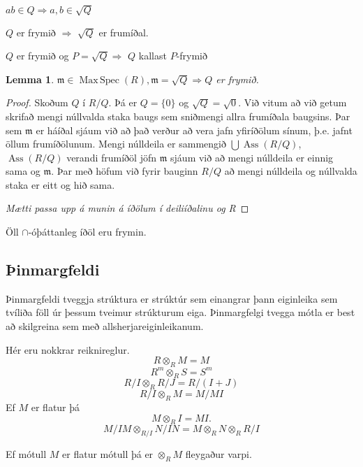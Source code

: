 \documentclass[a4paper, 14pt]{article}
\DeclareMathOperator{\Ass}{Ass}
\DeclareMathOperator{\MaxSpec}{Max\, Spec}
\newtheorem{lemma}{Lemma}
\let\tensor\otimes
\newcommand{\then}{\Longrightarrow}
\newcommand{\m}{\mathfrak{m}}
\begin{document}
$ab \in Q \then a,b \in \sqrt{Q}$

$Q$ er frymið $\then$ $\sqrt{Q}$ er frumíðal.

$Q$ er frymið og $P = \sqrt{Q} \then $ $Q$ kallast $P$-frymið

\begin{lemma}
$\m \in \MaxSpec(R), \m = \sqrt{Q} \then Q$ er frymið.
\end{lemma}
\begin{proof}
Skoðum $Q$ í $R/Q$. Þá er $Q = \{ 0 \}$ og $\sqrt{Q} = \sqrt{0}$. Við vitum
að við getum skrifað mengi núllvalda staka baugs sem sniðmengi allra frumíðala baugsins.
Þar sem $\m$ er háíðal sjáum við að það verður að vera jafn yfiríðölum sínum, þ.e. jafnt
öllum frumíðölunum. Mengi núlldeila er sammengið $\bigcup \Ass(R/Q)$, $\Ass(R/Q)$ verandi 
frumíðöl jöfn $\m$ sjáum við að mengi núlldeila er einnig sama og $\m$. Þar með höfum við
fyrir bauginn $R/Q$ að mengi núlldeila og núllvalda staka er eitt og hið sama.

\emph{Mætti passa upp á munin á íðölum í deiliíðalinu og R}

\end{proof}

Öll $\cap$-óþáttanleg íðöl eru frymin.

\subsection{Þinmargfeldi}
Þinmargfeldi tveggja strúktura er strúktúr sem einangrar þann eiginleika sem
tvíliða föll úr þessum tveimur strúkturum eiga.
Þinmargfelgi tvegga mótla er best að skilgreina sem með allsherjareiginleikanum. 

\begin{center}
\end{center}

Hér eru nokkrar reiknireglur.
\[
    R \tensor_R M = M
\]
\[
    R^m \tensor_R S = S^m
\]
\[
    R/I \tensor_R R/J = R/(I + J)
\]
\[
    R/I \tensor_R M = M/MI
\]
Ef $M$ er flatur þá
\[
M \tensor_R I = MI.
\]
\[
    M/IM \tensor_{R/I} N/IN = M \tensor_R N \tensor_R R/I
\]

Ef mótull $M$ er flatur mótull þá er $ \tensor_R M$ fleygaður varpi.
\end{document}
